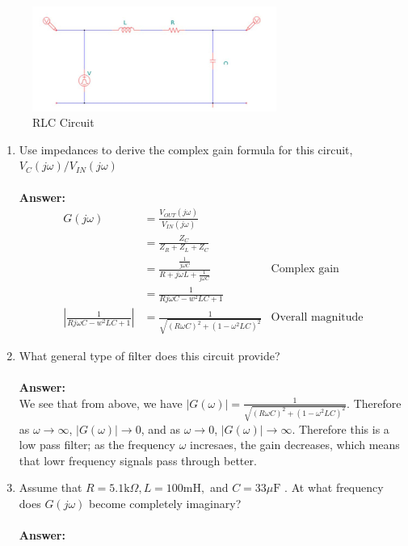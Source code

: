 \documentclass[12pt, a4paper]{article}
\begin{document}
\begin{figure}[H]
\begin{center}
\hypertarget{plot1}{}
\includegraphics[width = 8cm]{fig2}
\caption{\label{fig:scaled_diss} RLC Circuit}
\end{center}
\end{figure}
\begin{enumerate}
\item Use impedances to derive the complex gain formula for this circuit, $V_C({j\omega}) / V_{IN}(j\omega)$ \\ \\
\textbf{Answer: } \\
\begin{align*}
G(j\omega) &= \frac{V_{OUT}(j\omega)}{V_{IN}(j\omega)} \\
&= \frac{Z_{C}}{Z_{R} + Z_{L}+Z_{C}}\\
&= \frac{\frac{1}{j\omega C}}{R + j\omega L + \frac{1}{j\omega C}} &\text{Complex gain} \\
&= \frac{1}{Rj\omega C - w^2 LC + 1}\ \\
\left |  \frac{1}{Rj\omega C - w^2 LC + 1} \right | &= \frac{1}{\sqrt{(R\omega C)^2 + (1-\omega^2 LC)^2}}  &\text{Overall magnitude}
\end{align*}
\item What general type of filter does this circuit provide? \\ \\
\textbf{Answer: } \\
We see that from above, we have $|G(\omega)| = \frac{1}{\sqrt{(R\omega C)^2 + (1-\omega^2 LC)^2}}$. Therefore as $\omega \to \infty$, $|G(\omega)| \to 0$, and as $\omega \to 0$, $|G(\omega)| \to \infty$. Therefore this is a low pass filter; as the frequency $\omega$ incresaes, the gain decreases, which means that lowr frequency signals pass through better. 
\item Assume that $R=5.1 \mathrm{k} \Omega, L=100 \mathrm{mH},$ and $C=33 \mu \mathrm{F}$ . At what frequency does $G(j\omega)$ become completely imaginary? \\ \\
\textbf{Answer: } \\

\end{enumerate}
\end{document}
